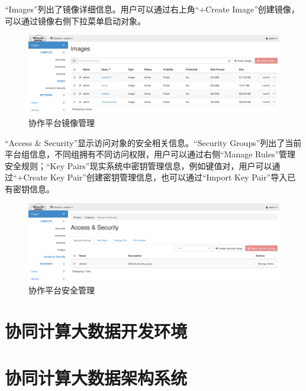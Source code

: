 \documentclass[12pt]{ctexart}%
\begin{document}
``Images''列出了镜像详细信息。用户可以通过右上角``+Create Image''创建镜像，可以通过镜像右侧下拉菜单启动对象。
\begin{figure}[!htb]
\centering
\includegraphics[width=6in]{./figures/Project_Compute_Images}
\caption{协作平台镜像管理}
\label{fig:projectcomputeimages}
\end{figure}
``Access \& Security''显示访问对象的安全相关信息。``Security Groups''列出了当前平台组信息，不同组拥有不同访问权限，用户可以通过右侧``Manage Rules''管理安全规则；``Key Pairs''现实系统中密钥管理信息，例如键值对，用户可以通过``+Create Key Pair''创建密钥管理信息，也可以通过``Import Key Pair''导入已有密钥信息。
\begin{figure}[!htb]
\centering
\includegraphics[width=6in]{./figures/Project_Compute_AccessSecurity}
\caption{协作平台安全管理}
\label{fig:projectcomputeAccessSecurity}
\end{figure} 
\section{协同计算大数据开发环境} 


\section{协同计算大数据架构系统}
\end{document}
